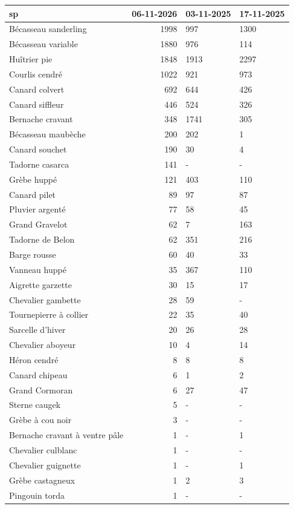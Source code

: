 \documentclass[
]{article}
\newcounter{none} %
\begin{document}
{\def\LTcaptype{none} %
\begin{longtable}[]{@{}lrll@{}}
\toprule\noalign{}
sp & 06-11-2026 & 03-11-2025 & 17-11-2025 \\
\midrule\noalign{}
\endhead
\bottomrule\noalign{}
\endlastfoot
Bécasseau sanderling & 1998 & 997 & 1300 \\
Bécasseau variable & 1880 & 976 & 114 \\
Huîtrier pie & 1848 & 1913 & 2297 \\
Courlis cendré & 1022 & 921 & 973 \\
Canard colvert & 692 & 644 & 426 \\
Canard siffleur & 446 & 524 & 326 \\
Bernache cravant & 348 & 1741 & 305 \\
Bécasseau maubèche & 200 & 202 & 1 \\
Canard souchet & 190 & 30 & 4 \\
Tadorne casarca & 141 & - & - \\
Grèbe huppé & 121 & 403 & 110 \\
Canard pilet & 89 & 97 & 87 \\
Pluvier argenté & 77 & 58 & 45 \\
Grand Gravelot & 62 & 7 & 163 \\
Tadorne de Belon & 62 & 351 & 216 \\
Barge rousse & 60 & 40 & 33 \\
Vanneau huppé & 35 & 367 & 110 \\
Aigrette garzette & 30 & 15 & 17 \\
Chevalier gambette & 28 & 59 & - \\
Tournepierre à collier & 22 & 35 & 40 \\
Sarcelle d'hiver & 20 & 26 & 28 \\
Chevalier aboyeur & 10 & 4 & 14 \\
Héron cendré & 8 & 8 & 8 \\
Canard chipeau & 6 & 1 & 2 \\
Grand Cormoran & 6 & 27 & 47 \\
Sterne caugek & 5 & - & - \\
Grèbe à cou noir & 3 & - & - \\
Bernache cravant à ventre pâle & 1 & - & 1 \\
Chevalier culblanc & 1 & - & - \\
Chevalier guignette & 1 & - & 1 \\
Grèbe castagneux & 1 & 2 & 3 \\
Pingouin torda & 1 & - & - \\
\end{longtable}
}
\end{document}
